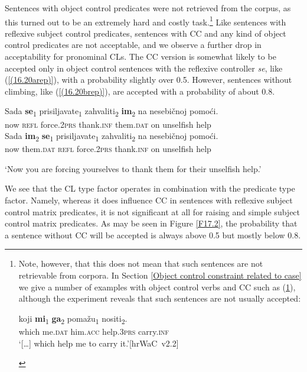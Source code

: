\noindent Sentences with object control predicates were not retrieved from the corpus, as this turned out to be an extremely hard and costly task.\footnote{Note, however, that this does not mean that such sentences are not retrievable from corpora. In Section \ref{Object control constraint related to case} we give a number of examples with object control verbs and CC such as (\ref{(11.51rep)}), although the experiment reveals that such sentences are not usually accepted: 

\begin{exe}\ex\label{(11.51rep)}
\gll [\dots] koji \textbf{mi}\textsubscript{1} \textbf{ga}\textsubscript{2} pomažu\textsubscript{1} nositi\textsubscript{2}. \\
 {} which me.\textsc{dat} him.\textsc{acc} help.3\textsc{prs} carry.\textsc{inf} \\
\glt ‘[\dots] which help me to carry it.’\hfill\hbox{[hrWaC v2.2]}
\end{exe}} Like sentences with reflexive subject control predicates, sentences with CC and any kind of object control predicates are not acceptable, and we observe a further drop in acceptability for pronominal CLs. The CC version is somewhat likely to be accepted only in object control sentences with the reflexive controller \textit{se}, like (\ref{(16.20arep)}), with a probability slightly over 0.5. However, sentences without climbing, like (\ref{(16.20brep)}), are accepted with a probability of about 0.8.

\begin{exe}\ex\begin{xlist}
\ex\label{(16.20arep)}
\gll Sada \textbf{se}\textsubscript{1} prisiljavate\textsubscript{1} zahvaliti\textsubscript{2} \textbf{im}\textsubscript{2} na nesebičnoj pomoći. \\
 now \textsc{refl} force.2\textsc{prs} thank.\textsc{inf} them.\textsc{dat} on unselfish help \\
\ex\label{(16.20brep)}
\gll Sada \textbf{im}\textsubscript{2} \textbf{se}\textsubscript{1} prisiljavate\textsubscript{1} zahvaliti\textsubscript{2} na nesebičnoj pomoći. \\
 now them.\textsc{dat} \textsc{refl} force.2\textsc{prs} thank.\textsc{inf} on unselfish help \\
\end{xlist}
\glt ‘Now you are forcing yourselves to thank them for their unselfish help.’
\end{exe}

\noindent We see that the CL type factor operates in combination with the predicate type factor. Namely, whereas it does influence CC in sentences with reflexive subject control matrix predicates, it is not significant at all for raising and simple subject control matrix predicates. As may be seen in Figure \ref{F17.2}, the probability that a sentence without CC will be accepted is always above 0.5 but mostly below 0.8.

